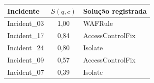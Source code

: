 \begin{tabular}{@{}lcl@{}}
\toprule
Incidente & $S(q,c)$ & Solu\c{c}\~ao registrada\\
\midrule
Incident\_03 & 1{,}00 & WAFRule\\
Incident\_17 & 0{,}84 & AccessControlFix\\
Incident\_24 & 0{,}80 & Isolate\\
Incident\_09 & 0{,}57 & AccessControlFix\\
Incident\_07 & 0{,}39 & Isolate\\
\bottomrule
\end{tabular}
